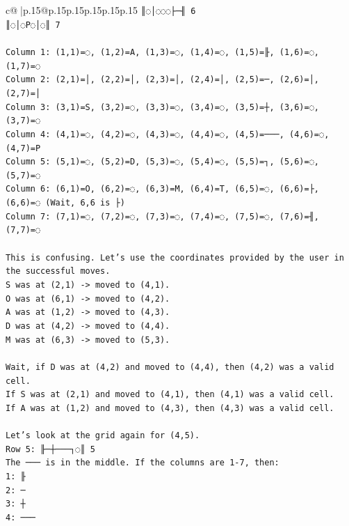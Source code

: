 \documentclass{article}
\begin{document}
{\begin{supertabular}{c@{$\;$}|p{.15\linewidth}@{}p{.15\linewidth}p{.15\linewidth}p{.15\linewidth}p{.15\linewidth}p{.15\linewidth}}
{{{\texttt{║◌│◌◌◌├─╢ 6} \\
\texttt{║◌│◌P◌│◌║ 7} \\
\\ 
\texttt{Column 1: (1,1)=◌, (1,2)=A, (1,3)=◌, (1,4)=◌, (1,5)=╟, (1,6)=◌, (1,7)=◌} \\
\texttt{Column 2: (2,1)=│, (2,2)=│, (2,3)=│, (2,4)=│, (2,5)=─, (2,6)=│, (2,7)=│} \\
\texttt{Column 3: (3,1)=S, (3,2)=◌, (3,3)=◌, (3,4)=◌, (3,5)=┼, (3,6)=◌, (3,7)=◌} \\
\texttt{Column 4: (4,1)=◌, (4,2)=◌, (4,3)=◌, (4,4)=◌, (4,5)=───, (4,6)=◌, (4,7)=P} \\
\texttt{Column 5: (5,1)=◌, (5,2)=D, (5,3)=◌, (5,4)=◌, (5,5)=┐, (5,6)=◌, (5,7)=◌} \\
\texttt{Column 6: (6,1)=O, (6,2)=◌, (6,3)=M, (6,4)=T, (6,5)=◌, (6,6)=├, (6,6)=◌ (Wait, 6,6 is ├)} \\
\texttt{Column 7: (7,1)=◌, (7,2)=◌, (7,3)=◌, (7,4)=◌, (7,5)=◌, (7,6)=╢, (7,7)=◌} \\
\\ 
\texttt{This is confusing. Let's use the coordinates provided by the user in the successful moves.} \\
\texttt{S was at (2,1) {-}> moved to (4,1).} \\
\texttt{O was at (6,1) {-}> moved to (4,2).} \\
\texttt{A was at (1,2) {-}> moved to (4,3).} \\
\texttt{D was at (4,2) {-}> moved to (4,4).} \\
\texttt{M was at (6,3) {-}> moved to (5,3).} \\
\\ 
\texttt{Wait, if D was at (4,2) and moved to (4,4), then (4,2) was a valid cell.} \\
\texttt{If S was at (2,1) and moved to (4,1), then (4,1) was a valid cell.} \\
\texttt{If A was at (1,2) and moved to (4,3), then (4,3) was a valid cell.} \\
\\ 
\texttt{Let's look at the grid again for (4,5).} \\
\texttt{Row 5: ╟─┼───┐◌║ 5} \\
\texttt{The ─── is in the middle. If the columns are 1{-}7, then:} \\
\texttt{1: ╟} \\
\texttt{2: ─} \\
\texttt{3: ┼} \\
\texttt{4: ───} \\
}}}
\end{supertabular}}
\end{document}
